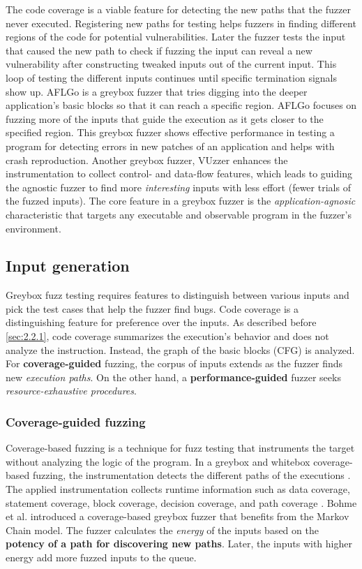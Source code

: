 The code coverage is a viable feature for detecting the new paths that the fuzzer never executed. Registering new paths for testing helps fuzzers in finding different regions of the code for potential vulnerabilities. Later the fuzzer tests the input that caused the new path to check if fuzzing the input can reveal a new vulnerability after constructing tweaked inputs out of the current input. This loop of testing the different inputs continues until specific termination signals show up. AFLGo \cite{bohme2017directed} is a greybox fuzzer that tries digging into the deeper application's basic blocks so that it can reach a specific region. AFLGo focuses on fuzzing more of the inputs that guide the execution as it gets closer to the specified region. This greybox fuzzer shows effective performance in testing a program for detecting errors in new patches of an application and helps with crash reproduction. Another greybox fuzzer, VUzzer \cite{rawat2017vuzzer} enhances the instrumentation to collect control- and data-flow features, which leads to guiding the agnostic fuzzer to find more \textit{interesting} inputs with less effort (fewer trials of the fuzzed inputs). The core feature in a greybox fuzzer is the \textit{application-agnosic} characteristic that targets any executable and observable program in the fuzzer's environment.

\subsection{Input generation}

Greybox fuzz testing requires features to distinguish between various inputs and pick the test cases that help the fuzzer find bugs. Code coverage is a distinguishing feature for preference over the inputs. As described before \ref{sec:2.2.1}, code coverage summarizes the execution's behavior and does not analyze the instruction. Instead, the graph of the basic blocks (CFG) is analyzed. For \textbf{coverage-guided} fuzzing, the corpus of inputs extends as the fuzzer finds new \textit{execution paths}. On the other hand, a \textbf{performance-guided} fuzzer seeks \textit{resource-exhaustive procedures}.

\subsubsection{Coverage-guided fuzzing}

Coverage-based fuzzing is a technique for fuzz testing that instruments the target without analyzing the logic of the program. In a greybox and whitebox coverage-based fuzzing, the instrumentation detects the different paths of the executions \cite{liang2018fuzzing}. The applied instrumentation collects runtime information such as data coverage, statement coverage, block coverage, decision coverage, and path coverage \cite{yang2009survey}. Bohme et al. \cite{bohme2017coverage} introduced a coverage-based greybox fuzzer that benefits from the Markov Chain model. The fuzzer calculates the \textit{energy} of the inputs based on the \textbf{potency of a path for discovering new paths}. Later, the inputs with higher energy add more fuzzed inputs to the queue.

